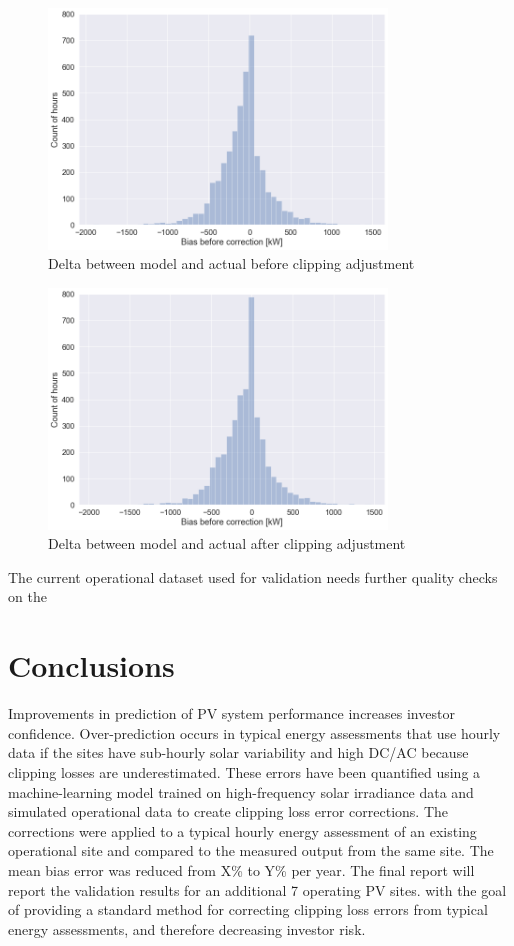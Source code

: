 \documentclass[conference]{IEEEtran}
\begin{document}
\begin{figure}[htbp]
\centerline{\includegraphics[width=9cm]{Error_before_correction_2.png}}
\caption{Delta between model and actual before clipping adjustment}
\label{fig:before-clipping-error}
\end{figure}

\begin{figure}[htbp]
\centerline{\includegraphics[width=9cm]{Error_after_correction_2.png}}
\caption{Delta between model and actual after clipping adjustment}
\label{fig:after-clipping-error}
\end{figure}

The current operational dataset used for validation needs further quality checks on the  

\section{Conclusions}
Improvements in prediction of PV system performance increases investor confidence. Over-prediction occurs in typical energy assessments that use hourly data if the sites have sub-hourly solar variability and high DC/AC because clipping losses are underestimated. These errors have been quantified using a machine-learning model trained on high-frequency solar irradiance data and simulated operational data to create clipping loss error corrections. The corrections were applied to a typical hourly energy assessment of an existing operational site and compared to the measured output from the same site. The mean bias error was reduced from X\% to Y\% per year. The final report will report the validation results for an additional 7 operating PV sites. with the goal of providing a standard method for correcting clipping loss errors from typical energy assessments, and therefore decreasing investor risk.
\end{document}
